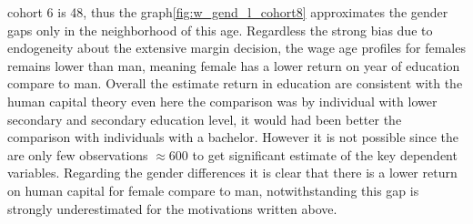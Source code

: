 \documentclass[12pt]{article}
\begin{document}
cohort 6 is 48, thus the graph\ref{fig:w_gend_l_cohort8} approximates the gender gaps  only in the neighborhood  of
this age. Regardless the strong bias due to endogeneity about the extensive margin decision, the wage age profiles for
females remains lower than man, meaning female has a lower return on year of education compare to man.
\newline
Overall the estimate return in education are consistent with the human capital theory even here the comparison was by
individual with lower secondary and secondary education level, it would had been better the comparison with individuals
with a bachelor. However it is not possible since the are only few observations $\approx 600$ to get significant
estimate of the key dependent variables. Regarding the gender differences it is clear that there is a lower return on
human capital for female compare to man, notwithstanding this gap is strongly underestimated for the motivations written
above.
\end{document}
